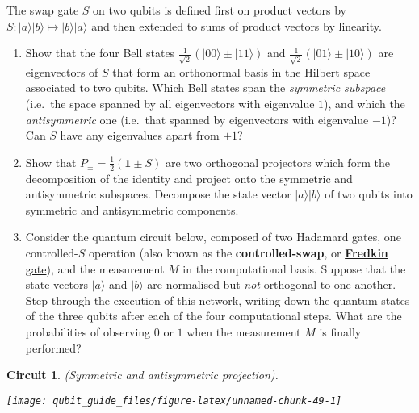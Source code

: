 \documentclass[fleqn]{article}
\newtheorem*{circuit}{Circuit}
\begin{document}
The swap gate \(S\) on two qubits is defined first on product vectors by \(S\colon|a\rangle|b\rangle\mapsto|b\rangle|a\rangle\) and then extended to sums of product vectors by linearity.

\begin{enumerate}
\def\labelenumi{\arabic{enumi}.}
\item
  Show that the four Bell states \(\frac{1}{\sqrt{2}}(|00\rangle\pm|11\rangle)\) and \(\frac{1}{\sqrt{2}}(|01\rangle\pm|10\rangle)\) are eigenvectors of \(S\) that form an orthonormal basis in the Hilbert space associated to two qubits.
  Which Bell states span the \emph{symmetric subspace} (i.e.~the space spanned by all eigenvectors with eigenvalue \(1\)), and which the \emph{antisymmetric} one (i.e.~that spanned by eigenvectors with eigenvalue \(-1\))?
  Can \(S\) have any eigenvalues apart from \(\pm1\)?
\item
  Show that \(P_\pm = \frac{1}{2}(\mathbf{1}\pm S)\) are two orthogonal projectors which form the decomposition of the identity and project onto the symmetric and antisymmetric subspaces.
  Decompose the state vector \(|a\rangle|b\rangle\) of two qubits into symmetric and antisymmetric components.
\item
  Consider the quantum circuit below, composed of two Hadamard gates, one controlled-\(S\) operation (also known as the \textbf{controlled-swap}, or \href{https://en.wikipedia.org/wiki/Fredkin_gate}{\textbf{Fredkin} gate}), and the measurement \(M\) in the computational basis.
  Suppose that the state vectors \(|a\rangle\) and \(|b\rangle\) are normalised but \emph{not} orthogonal to one another.
  Step through the execution of this network, writing down the quantum states of the three qubits after each of the four computational steps.
  What are the probabilities of observing \(0\) or \(1\) when the measurement \(M\) is finally performed?
\end{enumerate}

\begin{circuit}

(Symmetric and antisymmetric projection).

\begin{center}\texttt{[image: qubit\_guide\_files/figure-latex/unnamed-chunk-49-1]} \end{center}

\end{circuit}
\end{document}
